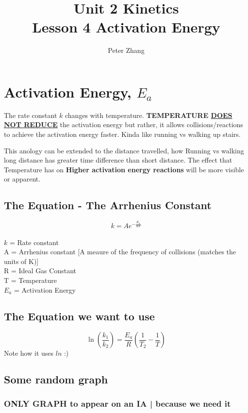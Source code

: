 \documentclass{article}
\title{Unit 2 Kinetics\\Lesson 4 Activation Energy}
\author{Peter Zhang}
\begin{document}
\maketitle
\newpage
\tableofcontents
\newpage

\section{Activation Energy, $E_{a}$}
The rate constant $k$ changes with temperature. \textbf{TEMPERATURE \underline{DOES NOT REDUCE}} the activation energy but rather, it allows collisions/reactions to achieve the activation energy faster. Kinda like running vs walking up stairs.

This anology can be extended to the distance travelled, how Running vs walking long distance has greater time difference than short distance. The effect that Temperature has on \textbf{Higher activation energy reactions} will be more visible or apparent.

\subsection{The Equation - The Arrhenius Constant}
$$k = Ae^{-\frac{E_{a}}{RT}}$$ \\$k$ = Rate constant\\A = Arrhenius constant [A meaure of the frequency of collisions (matches the units of K)]\\R = Ideal Gas Constant\\T = Temperature\\$E_{a}$ = Activation Energy

\subsection{The Equation we want to use}
$$\ln{(\frac{k_{1}}{k_{2}})} = \frac{E_{a}}{R}(\frac{1}{T_{2}} - \frac{1}{T})$$
Note how it uses $ln$ :)


\subsection{Some random graph}

\subsubsection{ONLY GRAPH to appear on an IA | because we need it}



\pagebreak
\end{document}
